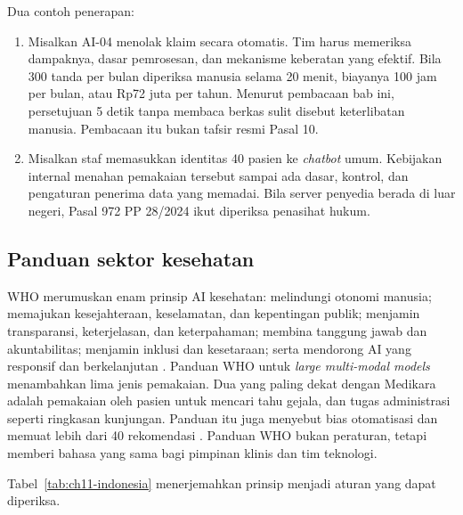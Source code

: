 Dua contoh penerapan:
\begin{enumerate}
  \item Misalkan AI-04 menolak klaim secara otomatis. Tim harus memeriksa dampaknya, dasar
  pemrosesan, dan mekanisme keberatan yang efektif. Bila 300 tanda per bulan diperiksa manusia
  selama 20 menit, biayanya 100 jam per bulan, atau Rp72 juta per tahun. Menurut pembacaan bab ini,
  persetujuan 5 detik tanpa membaca berkas sulit disebut keterlibatan manusia. Pembacaan itu bukan
  tafsir resmi Pasal 10.
  \item Misalkan staf memasukkan identitas 40 pasien ke \textit{chatbot} umum. Kebijakan internal
  menahan pemakaian tersebut sampai ada dasar, kontrol, dan pengaturan penerima data yang memadai.
  Bila server penyedia berada di luar negeri, Pasal 972 PP 28/2024 ikut diperiksa penasihat hukum.
\end{enumerate}

\subsection*{Panduan sektor kesehatan}

WHO merumuskan enam prinsip AI kesehatan: melindungi otonomi manusia; memajukan kesejahteraan,
keselamatan, dan kepentingan publik; menjamin transparansi, keterjelasan, dan keterpahaman; membina
tanggung jawab dan akuntabilitas; menjamin inklusi dan kesetaraan; serta mendorong AI yang responsif
dan berkelanjutan \cite{c11-who2021,c11-who2021-rilis}. Panduan WHO untuk \textit{large multi-modal
models} menambahkan lima jenis pemakaian. Dua yang paling dekat dengan Medikara adalah pemakaian
oleh pasien untuk mencari tahu gejala, dan tugas administrasi seperti ringkasan kunjungan. Panduan
itu juga menyebut bias otomatisasi dan memuat lebih dari 40 rekomendasi
\cite{c11-who2025,c11-who2024-rilis}. Panduan WHO bukan peraturan, tetapi memberi bahasa yang sama
bagi pimpinan klinis dan tim teknologi.

Tabel~\ref{tab:ch11-indonesia} menerjemahkan prinsip menjadi aturan yang dapat diperiksa.

